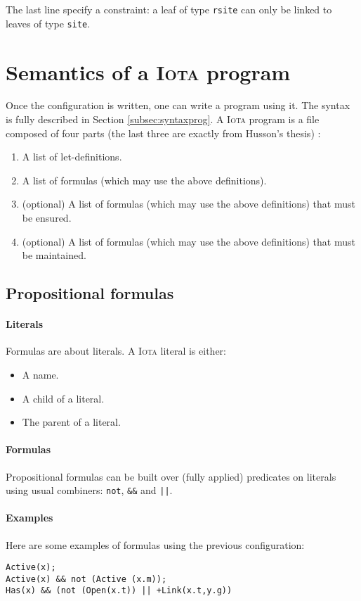 \documentclass[10pt,a4paper]{article}
\newcommand\Iota{\textsc{Iota}}
\newcommand{\ocaml}{\texttt}
\begin{document}
The last line specify a constraint: a leaf of type \ocaml{rsite} can only be linked to leaves of type \ocaml{site}.

\section{Semantics of a \Iota{} program}
Once the configuration is written, one can write a program using it. The syntax is fully described in Section \ref{subsec:syntaxprog}. A \Iota{} program is a file composed of four parts (the last three are exactly from Husson's thesis) :

\begin{enumerate}
\item A list of let-definitions.
\item A list of formulas (which may use the above definitions).
\item (optional) A list of formulas (which may use the above definitions) that must be ensured.
\item (optional) A list of formulas (which may use the above definitions) that must be maintained.
\end{enumerate}

\subsection{Propositional formulas}

\paragraph{Literals}
Formulas are about literals. A \Iota{} literal is either:
\begin{multicols}{2}
  \begin{itemize}
  \item A name.
  \item A child of a literal.
  \item The parent of a literal.
  \end{itemize}
\end{multicols}

\paragraph{Formulas}
Propositional formulas can be built over (fully applied) predicates on literals using usual combiners: \ocaml{not}, \ocaml{&&} and \ocaml{||}.

\paragraph{Examples}
Here are some examples of formulas using the previous configuration:
\begin{verbatim}
Active(x);
Active(x) && not (Active (x.m));
Has(x) && (not (Open(x.t)) || +Link(x.t,y.g))
\end{verbatim}
\end{document}
